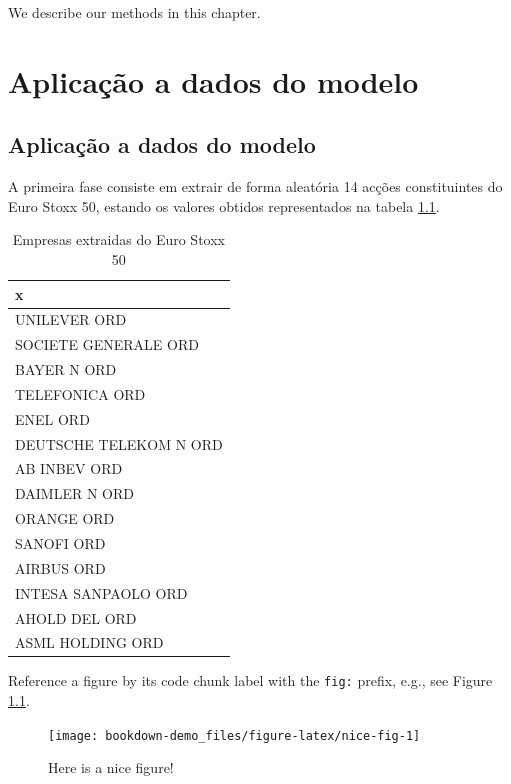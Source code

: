 \documentclass[
  12pt,
  a4paper,
  openany]{book}
\begin{document}
\newpage

We describe our methods in this chapter.

\hypertarget{aplicauxe7uxe3o-a-dados-do-modelo}{%
\chapter{Aplicação a dados do modelo}\label{aplicauxe7uxe3o-a-dados-do-modelo}}

\endgroup
\newpage

\hypertarget{aplicauxe7uxe3o-a-dados-do-modelo-1}{%
\section{Aplicação a dados do modelo}\label{aplicauxe7uxe3o-a-dados-do-modelo-1}}

A primeira fase consiste em extrair de forma aleatória 14 acções constituintes do Euro Stoxx 50, estando os valores obtidos representados na tabela \ref{tab:nice-tab}.
\scriptsize

\begin{table}[!h]

\caption{\label{tab:nice-tab}Empresas extraidas do Euro Stoxx 50}
\centering
\begin{tabular}[t]{l}
\toprule
x\\
\midrule
UNILEVER ORD\\
SOCIETE GENERALE ORD\\
BAYER N ORD\\
TELEFONICA ORD\\
ENEL ORD\\
\addlinespace
DEUTSCHE TELEKOM N ORD\\
AB INBEV ORD\\
DAIMLER N ORD\\
ORANGE ORD\\
SANOFI ORD\\
\addlinespace
AIRBUS ORD\\
INTESA SANPAOLO ORD\\
AHOLD DEL ORD\\
ASML HOLDING ORD\\
\bottomrule
\end{tabular}
\end{table}

\normalsize

Reference a figure by its code chunk label with the \texttt{fig:} prefix, e.g., see Figure \ref{fig:nice-fig}.
\scriptsize

\begin{figure}

{\centering \texttt{[image: bookdown-demo\_files/figure-latex/nice-fig-1]} 

}

\caption{Here is a nice figure!}\label{fig:nice-fig}
\end{figure}
\end{document}
